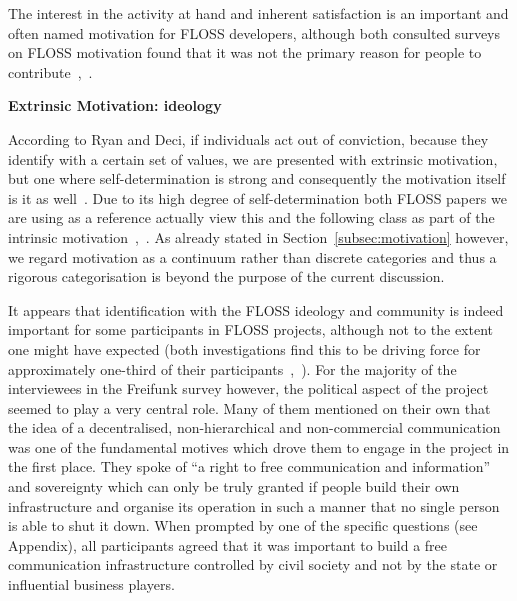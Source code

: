 The interest in the activity at hand and inherent satisfaction is an important and often named motivation for FLOSS developers, although both consulted surveys on FLOSS motivation found that it was not the primary reason for people to contribute~\cite{HarOu2002},~\cite{LakWo2005}.


\textbf{Extrinsic Motivation: ideology}

According to Ryan and Deci, if individuals act out of conviction, because they identify with a certain set of values, we are presented with extrinsic motivation, but one where self-determination is strong and consequently the motivation itself is it as well~\cite{RyDe2000}.
Due to its high degree of self-determination both FLOSS papers we are using as a reference actually view this and the following class as part of the intrinsic motivation~\cite{LakWo2005},~\cite{HarOu2002}.
As already stated in Section~\ref{subsec:motivation} however, we regard motivation as a continuum rather than discrete categories and thus a rigorous categorisation is beyond the purpose of the current discussion.

It appears that identification with the FLOSS ideology and community is indeed important for some participants in FLOSS projects, although not to the extent one might have expected (both investigations find this to be driving force for approximately one-third of their participants~\cite{HarOu2002},~\cite{LakWo2005}).
For the majority of the interviewees in the Freifunk survey however, the political aspect of the project seemed to play a very central role.
Many of them mentioned on their own that the idea of a decentralised, non-hierarchical and non-commercial communication was one of the fundamental motives which drove them to engage in the project in the first place.
They spoke of ``a right to free communication and information'' and sovereignty which can only be truly granted if people build their own infrastructure and organise its operation in such a manner that no single person is able to shut it down.
When prompted by one of the specific questions (see Appendix), all participants agreed that it was important to build a free communication infrastructure controlled by civil society and not by the state or influential business players.

